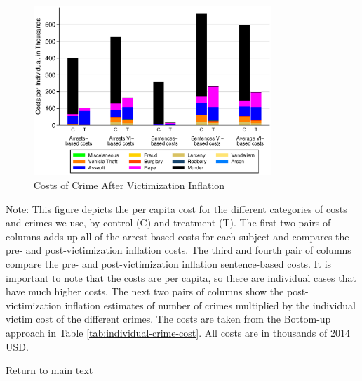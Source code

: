 \documentclass[static]{JJH-Beamer}
\begin{document}
\begin{frame}
 \addtocounter{framenumber}{-1}

\begin{figure} [H]
\caption{Costs of Crime After Victimization Inflation}\label{tab:costs_vi}
\begin{center}
\includegraphics[width=0.8\textwidth]{AppOutput/Crime/costs_vi}
\end{center}
\end{figure}

\end{frame}

{\flushleft \normalsize Note: This figure depicts the per capita cost for the different categories of costs and crimes we use, by control (C) and treatment (T). The first two pairs of columns adds up all of the arrest-based costs for each subject and compares the pre- and post-victimization inflation costs. The third and fourth pair of columns compare the pre- and post-victimization inflation sentence-based costs. It is important to note that the costs are per capita, so there are individual cases that have much higher costs. The next two pairs of columns show the post-victimization inflation estimates of number of crimes multiplied by the individual victim cost of the different crimes. The costs are taken from the Bottom-up approach in Table \ref{tab:individual-crime-cost}. All costs are in thousands of 2014 USD.\\}

\begin{frame}
 \addtocounter{framenumber}{-1}

\begin{center}
\hyperlink{ret:muffin}{\underline{Return to main text}}
\end{center}

\end{frame}
\end{document}
